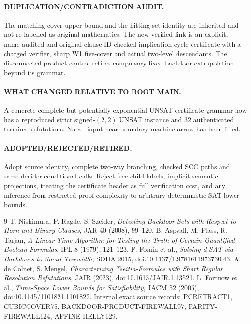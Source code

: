 \documentclass[11pt]{article}
\begin{document}
\paragraph{DUPLICATION/CONTRADICTION AUDIT.} The matching-cover upper bound and the hitting-set identity are inherited and not re-labelled as original mathematics. The new verified link is an explicit, name-audited and original-clause-ID checked implication-cycle certificate with a charged verifier, sharp W1 five-cover and actual two-level descendants. The disconnected-product control retires compulsory fixed-backdoor extrapolation beyond its grammar.
\paragraph{WHAT CHANGED RELATIVE TO ROOT MAIN.} A concrete complete-but-potentially-exponential UNSAT certificate grammar now has a reproduced strict signed-$(2,2)$ UNSAT instance and 32 authenticated terminal refutations. No all-input near-boundary machine arrow has been filled.
\paragraph{ADOPTED/REJECTED/RETIRED.} Adopt source identity, complete two-way branching, checked SCC paths and same-decider conditional calls. Reject free child labels, implicit semantic projections, treating the certificate header as full verification cost, and any inference from restricted proof complexity to arbitrary deterministic SAT lower bounds.
\begin{thebibliography}{9}
 T. Nishimura, P. Ragde, S. Szeider, \emph{Detecting Backdoor Sets with Respect to Horn and Binary Clauses}, JAR 40 (2008), 99--120.
 B. Aspvall, M. Plass, R. Tarjan, \emph{A Linear-Time Algorithm for Testing the Truth of Certain Quantified Boolean Formulas}, IPL 8 (1979), 121--123.
 F. Fomin et al., \emph{Solving d-SAT via Backdoors to Small Treewidth}, SODA 2015, doi:10.1137/1.9781611973730.43.
 A. de Colnet, S. Mengel, \emph{Characterizing Tseitin-Formulas with Short Regular Resolution Refutations}, JAIR (2023), doi:10.1613/JAIR.1.13521.
 L. Fortnow et al., \emph{Time-Space Lower Bounds for Satisfiability}, JACM 52 (2005), doi:10.1145/1101821.1101822.
 Internal exact source records: PCRETRACT1, CUBICCOVER75, BACKDOOR-PRODUCT-FIREWALL97, PARITY-FIREWALL124, AFFINE-HELLY129.
\end{thebibliography}
\end{document}
